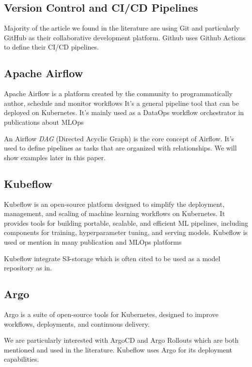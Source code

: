 \subsection{Version Control and CI/CD Pipelines}\label{subsec:version-control-and-ci/cd-pipelines}
Majority of the article we found in the literature are using Git and particularly GitHub\cite{github} as their collaborative development platform.
Github uses Github Actions to define their CI/CD pipelines.

\subsection{Apache Airflow}\label{subsec:apache-airflow}
Apache Airflow\cite{airflow} is a platform created by the community to programmatically author, schedule and monitor workflows\cite{airflow}
It's a general pipeline tool that can be deployed on Kubernetes.
It's mainly used as a DataOps workflow orchestrator in publications about MLOps\cite{???,10245408}

An Airflow \textit{DAG} (Directed Acyclic Graph) is the core concept of Airflow\cite{airflow}.
It's used to define pipelines as tasks that are organized with relationships.
We will show examples later in this paper.

\subsection{Kubeflow}\label{subsec:kubeflow2}
Kubeflow\cite{Kubeflow} is an open-source platform designed to simplify the deployment, management, and scaling of machine learning workflows on Kubernetes.
It provides tools for building portable, scalable, and efficient ML pipelines, including components for training, hyperparameter tuning, and serving models.
Kubeflow is used or mention in many publication and MLOps platforms\cite{inproceedings,10855428}

Kubeflow integrate S3-storage which is often cited to be used as a model repository as in\cite{BURGUENOROMERO2025107499}.

\subsection{Argo}\label{subsec:argo}
Argo\cite{argo} is a suite of open-source tools for Kubernetes, designed to improve workflows, deployments, and continuous delivery.

We are particularly interested with ArgoCD and Argo Rollouts which are both mentioned and used in the literature.
Kubeflow uses Argo for its deployment capabilities.

